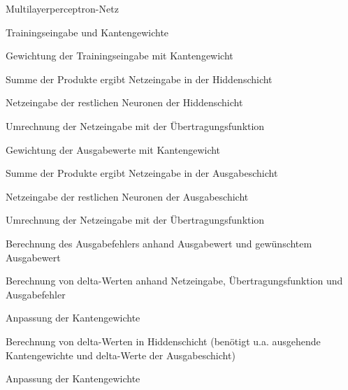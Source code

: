 \begin{frame}[c]
  \begin{itemize}
     {
      \item Multilayerperceptron-Netz
    }
     {
      \item Trainingseingabe und Kantengewichte
    }
     {
      \item Gewichtung der Trainingseingabe mit Kantengewicht
    }
     {
      \item Summe der Produkte ergibt Netzeingabe in der Hiddenschicht
    }
     {
      \item Netzeingabe der restlichen Neuronen der Hiddenschicht
    }
     {
      \item Umrechnung der Netzeingabe mit der Übertragungsfunktion
    }
     {
      \item Gewichtung der Ausgabewerte mit Kantengewicht
    }
     {
      \item Summe der Produkte ergibt Netzeingabe in der Ausgabeschicht
    }
     {
      \item Netzeingabe der restlichen Neuronen der Ausgabeschicht
    }
     {
      \item Umrechnung der Netzeingabe mit der Übertragungsfunktion
    }
     {
      \item Berechnung des Ausgabefehlers anhand Ausgabewert und gewünschtem Ausgabewert
    }
     {
      \item Berechnung von delta-Werten anhand Netzeingabe, Übertragungsfunktion und Ausgabefehler 
    }
     {
      \item Anpassung der Kantengewichte
    }
     {
      \item Berechnung von delta-Werten in Hiddenschicht (benötigt u.a. ausgehende Kantengewichte und delta-Werte der Ausgabeschicht)
    }
     {
      \item Anpassung der Kantengewichte
    }
   \end{itemize}
  

\end{frame}
